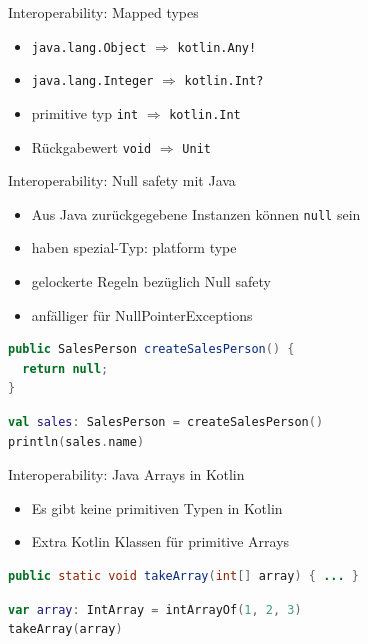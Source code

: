 \documentclass{beamer}
\begin{document}
\begin{frame}[fragile]{Interoperability: Mapped types}
  \begin{itemize}
    \item \texttt{java.lang.Object} $\Rightarrow$ \texttt{kotlin.Any!}
    \item \texttt{java.lang.Integer} $\Rightarrow$ \texttt{kotlin.Int?}
    \item primitive typ \texttt{int} $\Rightarrow$ \texttt{kotlin.Int}
    \item Rückgabewert \texttt{void} $\Rightarrow$ \texttt{Unit}
  \end{itemize}
\end{frame}

\begin{frame}[fragile]{Interoperability: Null safety mit Java}
  \begin{itemize}
    \item Aus Java zurückgegebene Instanzen können \texttt{null} sein
    \item haben spezial-Typ: platform type
    \item gelockerte Regeln bezüglich Null safety
    \item anfälliger für NullPointerExceptions
  \end{itemize}
  \begin{lstlisting}[language=Java]
public SalesPerson createSalesPerson() {
  return null;
}
  \end{lstlisting}
  \begin{lstlisting}[language=Kotlin]
val sales: SalesPerson = createSalesPerson()
println(sales.name)
  \end{lstlisting}
\end{frame}

\begin{frame}[fragile]{Interoperability: Java Arrays in Kotlin}
  \begin{itemize}
    \item Es gibt keine primitiven Typen in Kotlin
    \item Extra Kotlin Klassen für primitive Arrays
  \end{itemize}
  \begin{lstlisting}[language=Java]
public static void takeArray(int[] array) { ... }
  \end{lstlisting}
  \begin{lstlisting}[language=Kotlin]
var array: IntArray = intArrayOf(1, 2, 3)
takeArray(array)
  \end{lstlisting}
\end{frame}
\end{document}
